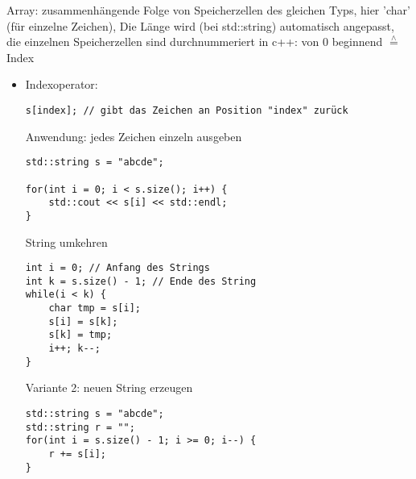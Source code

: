 \documentclass[a4paper]{scrartcl}
\newcommand{\estimates}{\overset{\scriptscriptstyle\wedge}{=}}%
\theoremstyle{definition}
\theoremstyle{plain}
\theoremstyle{remark}
\theoremstyle{remark}
\begin{document}
\begin{itemize}
\begin{itemize}
           Array: zusammenhängende Folge von Speicherzellen des gleichen Typs, hier 'char' (für einzelne Zeichen), Die Länge wird (bei std::string) automatisch angepasst, die einzelnen Speicherzellen sind durchnummeriert
in c++: von $0$ beginnend $\estimates$ Index
\begin{itemize}
\item Indexoperator:
\begin{verbatim}
s[index]; // gibt das Zeichen an Position "index" zurück
\end{verbatim}
Anwendung: jedes Zeichen einzeln ausgeben
\begin{verbatim}
std::string s = "abcde";

for(int i = 0; i < s.size(); i++) {
	std::cout << s[i] << std::endl;
}
\end{verbatim}
String umkehren
\begin{verbatim}
int i = 0; // Anfang des Strings
int k = s.size() - 1; // Ende des String
while(i < k) {
	char tmp = s[i];
	s[i] = s[k];
	s[k] = tmp;
	i++; k--;
}
\end{verbatim}
Variante 2: neuen String erzeugen
\begin{verbatim}
std::string s = "abcde";
std::string r = "";
for(int i = s.size() - 1; i >= 0; i--) {
	r += s[i];
}
\end{verbatim}
\end{itemize}
\end{itemize}
\end{itemize}
\end{document}
